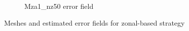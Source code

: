\begin{figure}[H]
\begin{subfigure}[b]{0.475\textwidth}
\caption{Mza1\_nz50 error field}
\label{fig:Mza1_err_plot}
\end{subfigure}
\caption{Meshes and estimated error fields for zonal-based strategy}
\end{figure}

